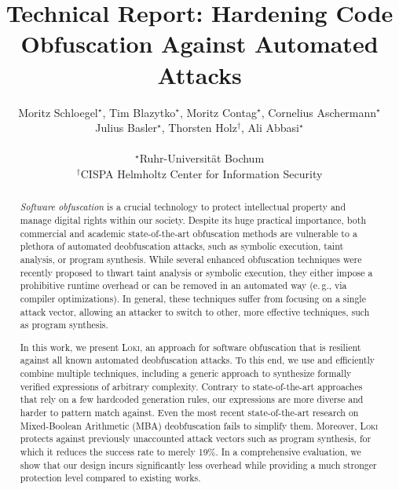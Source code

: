 \documentclass[letterpaper,twocolumn,10pt]{article}
\newcommand{\eg}{e.\,g.,\xspace}
\theoremstyle{customexample}
\theoremstyle{customexperiment}
\newcommand{\loki}{\textsc{Loki}\xspace}
\begin{document}
\date{}

\title{\Large \bf Technical Report: Hardening Code Obfuscation Against Automated Attacks}


\author{
{\rm Moritz Schloegel$^\star$, Tim Blazytko$^\star$, Moritz Contag$^\star$, Cornelius Aschermann$^\star$} \\{\rm Julius Basler$^\star$, Thorsten Holz$^\dagger$, Ali Abbasi$^\star$}\\\\$^\star$Ruhr-Universit\"{a}t Bochum\\
$^\dagger$CISPA Helmholtz Center for Information Security\\
} 


\maketitle{}

\vspace{-5em}
\begin{abstract}
\emph{Software obfuscation} is a crucial technology to protect intellectual property and manage digital rights within our society. Despite its huge practical importance, both commercial and academic state-of-the-art obfuscation methods are vulnerable to a plethora of automated deobfuscation attacks, such as symbolic execution, taint analysis, or program synthesis. While several enhanced obfuscation techniques were recently proposed to thwart taint analysis or symbolic execution, they either impose a prohibitive runtime overhead or can be removed in an automated way (\eg via compiler optimizations). In general, these techniques suffer from focusing on a single attack vector, allowing an attacker to switch to other, more effective techniques, such as program synthesis.

In this work, we present \loki, an approach for software obfuscation that is resilient against all known automated deobfuscation attacks. To this end, we use and efficiently combine multiple techniques, including a generic approach to synthesize formally verified expressions of arbitrary complexity. Contrary to state-of-the-art approaches that rely on a few hardcoded generation rules, our expressions are more diverse and harder to pattern match against. Even the most recent state-of-the-art research on Mixed-Boolean Arithmetic (MBA) deobfuscation fails to simplify them. Moreover, \loki protects against previously unaccounted attack vectors such as program synthesis, for which it reduces the success rate to merely 19\%. In a comprehensive evaluation, we show that our design incurs significantly less overhead while providing a much stronger protection level compared to existing works.
\end{abstract}
\end{document}
